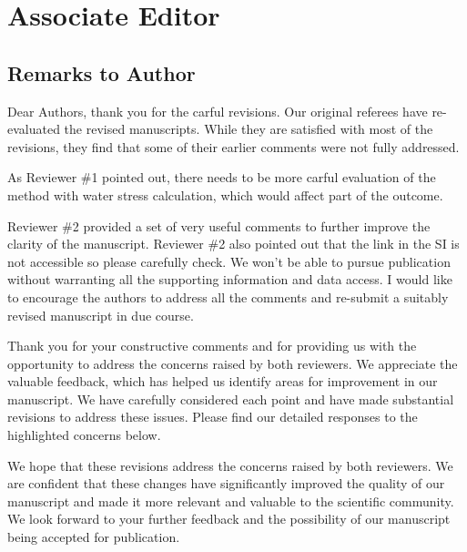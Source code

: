 \section*{Associate Editor}\label{editor}

\subsection{Remarks to Author}
\RC{} Dear Authors, thank you for the carful revisions. Our original referees have re-evaluated the revised manuscripts. While they are satisfied with most of the revisions, they find that some of their earlier comments were not fully addressed.

\RC{} As Reviewer \#1 pointed out, there needs to be more carful evaluation of the method with water stress calculation, which would affect part of the outcome.

\AR{}

\RC{} Reviewer \#2 provided a set of very useful comments to further improve the clarity of the manuscript. Reviewer \#2 also pointed out that the link in the SI is not accessible so please carefully check. We won't be able to pursue publication without warranting all the supporting information and data access. I would like to encourage the authors to address all the comments and re-submit a suitably revised manuscript in due course.

\AR{} Thank you for your constructive comments and for providing us with the opportunity to address the concerns raised by both reviewers. We appreciate the valuable feedback, which has helped us identify areas for improvement in our manuscript. We have carefully considered each point and have made substantial revisions to address these issues. Please find our detailed responses to the highlighted concerns below.

\AR*{} We hope that these revisions address the concerns raised by both reviewers. We are confident that these changes have significantly improved the quality of our manuscript and made it more relevant and valuable to the scientific community. We look forward to your further feedback and the possibility of our manuscript being accepted for publication.
